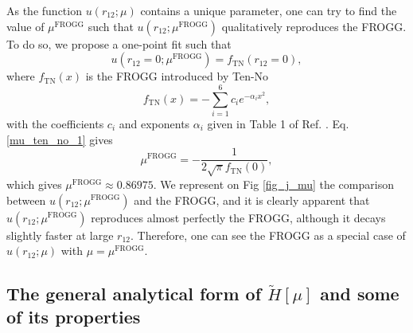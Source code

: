 \documentclass[aip,jcp,reprint,noshowkeys,superscriptaddress]{revtex4-1}
\newcommand{\mfrogg}[0]{\mu^\text{FROGG}}
\begin{document}
As the function $u(r_{12};\mu)$ contains a unique parameter, one can try to find the value of $\mfrogg$ such that 
$u(r_{12};\mfrogg)$ qualitatively reproduces the FROGG. 
To do so, we propose a one-point fit such that 
\begin{equation}
 \label{mu_ten_no_1}
u(r_{12}=0;\mfrogg) = f_{\text{TN}}(r_{12}=0), 
\end{equation}
where $ f_{\text{TN}}(x)$ is the FROGG introduced by Ten-No
\begin{equation}
 \label{eq_frogg}
 f_{\text{TN}}(x) = -\sum_{i=1}^6 c_i e^{-\alpha_i x^2 },
\end{equation}
with the coefficients $c_i$ and exponents $\alpha_i$ given in Table 1 of Ref. . 
Eq. \eqref{mu_ten_no_1} gives 
\begin{equation}
 \label{mu_ten_no_2}
 \mfrogg = -\frac{1}{2\sqrt{\pi}f_{\text{TN}}(0)},
\end{equation}
which gives $\mfrogg\approx0.86975$. 
We represent on Fig \ref{fig_j_mu} the comparison between $u(r_{12};\mfrogg)$ and the FROGG, and it is clearly apparent  that $u(r_{12};\mfrogg)$ reproduces almost perfectly the FROGG, although it decays slightly faster at large $r_{12}$. Therefore, one can see the FROGG as a special case of $u(r_{12};\mu)$  with $\mu = \mfrogg$. 

\subsection{The general analytical form of  $\tilde{H}[\mu]$ and some of its properties}
\label{sec:ht_general}
\end{document}
